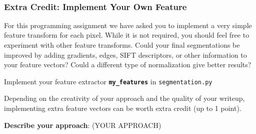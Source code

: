 \documentclass[11pt]{article}
\begin{document}
    \begin{center}
    \end{center}
    { \hspace*{\fill} \\}
    
    \hypertarget{extra-credit-implement-your-own-feature}{%
\subsubsection{Extra Credit: Implement Your Own
Feature}\label{extra-credit-implement-your-own-feature}}

For this programming assignment we have asked you to implement a very
simple feature transform for each pixel. While it is not required, you
should feel free to experiment with other feature transforms. Could your
final segmentations be improved by adding gradients, edges, SIFT
descriptors, or other information to your feature vectors? Could a
different type of normalization give better results?

Implement your feature extractor \textbf{\texttt{my\_features}} in
\texttt{segmentation.py}

Depending on the creativity of your approach and the quality of your
writeup, implementing extra feature vectors can be worth extra credit
(up to 1 point).

    \textbf{Describe your approach}: (YOUR APPROACH)
\end{document}
